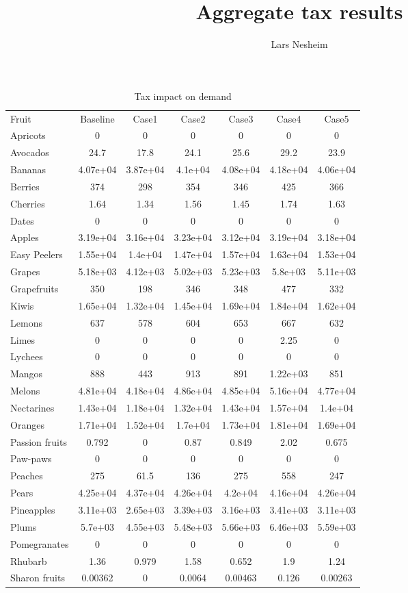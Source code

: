 \documentclass[11pt]{article}
\title{Aggregate tax results}
\author{Lars Nesheim}
\date{}
\begin{document}
\maketitle
\begin{table}[h]
\caption{Tax impact on demand}
\label{table:tax impact 1}
\begin{center}
\begin{tabular}{lcccccc} \hline \hline
Fruit & Baseline & Case1 & Case2 & Case3 & Case4 & Case5 \\
Apricots &0 &0 &0 &0 &0 &0 \\
Avocados &24.7 &17.8 &24.1 &25.6 &29.2 &23.9 \\
Bananas &4.07e+04 &3.87e+04 &4.1e+04 &4.08e+04 &4.18e+04 &4.06e+04 \\
Berries &374 &298 &354 &346 &425 &366 \\
Cherries &1.64 &1.34 &1.56 &1.45 &1.74 &1.63 \\
\hline
Dates &0 &0 &0 &0 &0 &0 \\
Apples &3.19e+04 &3.16e+04 &3.23e+04 &3.12e+04 &3.19e+04 &3.18e+04 \\
Easy Peelers &1.55e+04 &1.4e+04 &1.47e+04 &1.57e+04 &1.63e+04 &1.53e+04 \\
Grapes &5.18e+03 &4.12e+03 &5.02e+03 &5.23e+03 &5.8e+03 &5.11e+03 \\
Grapefruits &350 &198 &346 &348 &477 &332 \\
\hline
Kiwis &1.65e+04 &1.32e+04 &1.45e+04 &1.69e+04 &1.84e+04 &1.62e+04 \\
Lemons &637 &578 &604 &653 &667 &632 \\
Limes &0 &0 &0 &0 &2.25 &0 \\
Lychees &0 &0 &0 &0 &0 &0 \\
Mangos &888 &443 &913 &891 &1.22e+03 &851 \\
\hline
Melons &4.81e+04 &4.18e+04 &4.86e+04 &4.85e+04 &5.16e+04 &4.77e+04 \\
Nectarines &1.43e+04 &1.18e+04 &1.32e+04 &1.43e+04 &1.57e+04 &1.4e+04 \\
Oranges &1.71e+04 &1.52e+04 &1.7e+04 &1.73e+04 &1.81e+04 &1.69e+04 \\
Passion fruits &0.792 &0 &0.87 &0.849 &2.02 &0.675 \\
Paw-paws &0 &0 &0 &0 &0 &0 \\
\hline
Peaches &275 &61.5 &136 &275 &558 &247 \\
Pears &4.25e+04 &4.37e+04 &4.26e+04 &4.2e+04 &4.16e+04 &4.26e+04 \\
Pineapples &3.11e+03 &2.65e+03 &3.39e+03 &3.16e+03 &3.41e+03 &3.11e+03 \\
Plums &5.7e+03 &4.55e+03 &5.48e+03 &5.66e+03 &6.46e+03 &5.59e+03 \\
Pomegranates &0 &0 &0 &0 &0 &0 \\
\hline
Rhubarb &1.36 &0.979 &1.58 &0.652 &1.9 &1.24 \\
Sharon fruits &0.00362 &0 &0.0064 &0.00463 &0.126 &0.00263 \\
 \hline \hline
\end{tabular}
\end{center}
\end{table}
\end{document}
